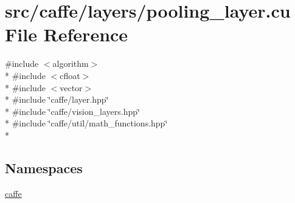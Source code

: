 \hypertarget{pooling__layer_8cu}{\section{src/caffe/layers/pooling\+\_\+layer.cu File Reference}
\label{pooling__layer_8cu}
}
{\ttfamily \#include $<$algorithm$>$}\\*
{\ttfamily \#include $<$cfloat$>$}\\*
{\ttfamily \#include $<$vector$>$}\\*
{\ttfamily \#include \char`\"{}caffe/layer.\+hpp\char`\"{}}\\*
{\ttfamily \#include \char`\"{}caffe/vision\+\_\+layers.\+hpp\char`\"{}}\\*
{\ttfamily \#include \char`\"{}caffe/util/math\+\_\+functions.\+hpp\char`\"{}}\\*
\subsection*{Namespaces}
\begin{DoxyCompactItemize}
\item 
 \hyperlink{namespacecaffe}{caffe}
\end{DoxyCompactItemize}
